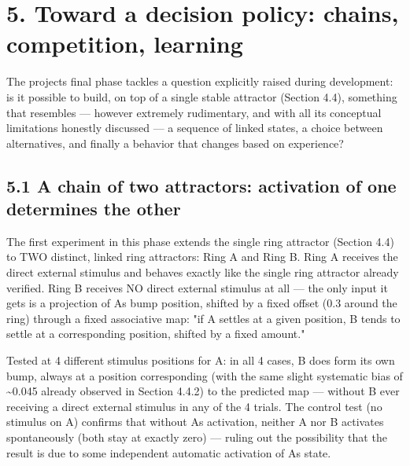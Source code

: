 \documentclass[
  english,
]{article}
\begin{document}
\section{5. Toward a decision policy: chains, competition, learning}\label{toward-a-decision-policy-chains-competition-learning}

The project\textquotesingle s final phase tackles a question explicitly raised during development: is it possible to build, on top of a single stable attractor (Section 4.4), something that resembles --- however extremely rudimentary, and with all its conceptual limitations honestly discussed --- a sequence of linked states, a choice between alternatives, and finally a behavior that changes based on experience?

\subsection{5.1 A chain of two attractors: activation of one determines the other}\label{a-chain-of-two-attractors-activation-of-one-determines-the-other}

The first experiment in this phase extends the single ring attractor (Section 4.4) to TWO distinct, linked ring attractors: Ring A and Ring B. Ring A receives the direct external stimulus and behaves exactly like the single ring attractor already verified. Ring B receives NO direct external stimulus at all --- the only input it gets is a projection of A\textquotesingle s bump position, shifted by a fixed offset (0.3 around the ring) through a fixed associative map: "if A settles at a given position, B tends to settle at a corresponding position, shifted by a fixed amount."

Tested at 4 different stimulus positions for A: in all 4 cases, B does form its own bump, always at a position corresponding (with the same slight systematic bias of \textasciitilde0.045 already observed in Section 4.4.2) to the predicted map --- without B ever receiving a direct external stimulus in any of the 4 trials. The control test (no stimulus on A) confirms that without A\textquotesingle s activation, neither A nor B activates spontaneously (both stay at exactly zero) --- ruling out the possibility that the result is due to some independent automatic activation of A\textquotesingle s state.
\end{document}
